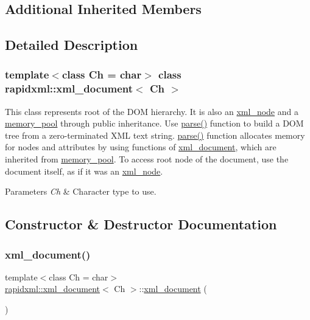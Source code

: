 \subsection*{Additional Inherited Members}


\subsection{Detailed Description}
\subsubsection*{template$<$class Ch = char$>$\newline
class rapidxml\+::xml\+\_\+document$<$ Ch $>$}

This class represents root of the D\+OM hierarchy. It is also an \mbox{\hyperlink{classrapidxml_1_1xml__node}{xml\+\_\+node}} and a \mbox{\hyperlink{classrapidxml_1_1memory__pool}{memory\+\_\+pool}} through public inheritance. Use \mbox{\hyperlink{classrapidxml_1_1xml__document_ac6e73ff9ac323bf5a370c38feb03a6b1}{parse()}} function to build a D\+OM tree from a zero-\/terminated X\+ML text string. \mbox{\hyperlink{classrapidxml_1_1xml__document_ac6e73ff9ac323bf5a370c38feb03a6b1}{parse()}} function allocates memory for nodes and attributes by using functions of \mbox{\hyperlink{classrapidxml_1_1xml__document}{xml\+\_\+document}}, which are inherited from \mbox{\hyperlink{classrapidxml_1_1memory__pool}{memory\+\_\+pool}}. To access root node of the document, use the document itself, as if it was an \mbox{\hyperlink{classrapidxml_1_1xml__node}{xml\+\_\+node}}.
\begin{DoxyParams}{Parameters}
{\em Ch} & Character type to use. \\
\hline
\end{DoxyParams}


\subsection{Constructor \& Destructor Documentation}
\mbox{\label{classrapidxml_1_1xml__document_aae8841b15085ba8f32ff46587ace28f5}} 
\subsubsection{\texorpdfstring{xml\_document()}{xml\_document()}}
{\footnotesize\ttfamily template$<$class Ch = char$>$ \\
\mbox{\hyperlink{classrapidxml_1_1xml__document}{rapidxml\+::xml\+\_\+document}}$<$ Ch $>$\+::\mbox{\hyperlink{classrapidxml_1_1xml__document}{xml\+\_\+document}} (\begin{DoxyParamCaption}{ }\end{DoxyParamCaption})\hspace{0.3cm}{\ttfamily [inline]}}



